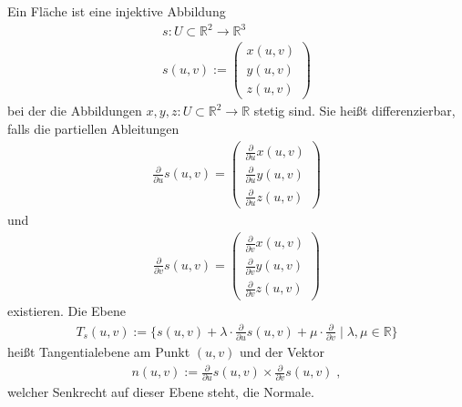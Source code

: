 \begin{Definition}
Ein Fläche ist   eine injektive Abbildung
\begin{align*}
s: U \subset \mathbb{R}^2 \to \mathbb{R}^3 \\
s(u,v) := \begin{pmatrix} x(u,v) \\ y(u,v) \\ z(u,v) \end{pmatrix} 
\end{align*} 
bei der die Abbildungen $x, y, z : U \subset \mathbb{R}^2 \to \mathbb{R}$ stetig sind. Sie heißt differenzierbar, falls die partiellen Ableitungen
\begin{align*}
\frac{\partial}{\partial u} s(u,v) = \begin{pmatrix}  \frac{\partial}{\partial u} x(u,v) \\  \frac{\partial}{\partial u} y(u,v) \\  \frac{\partial}{\partial u} z(u,v) \end{pmatrix}
\end{align*}
und 
\begin{align*}
\frac{\partial}{\partial v} s(u,v) =  \begin{pmatrix} \frac{\partial}{\partial v} x(u,v) \\ \frac{\partial}{\partial v} y(u,v) \\ \frac{\partial}{\partial v} z(u,v) \end{pmatrix}
\end{align*}
existieren. Die Ebene 
\begin{align*}
T_s(u,v) :=  \{ s(u,v) + \lambda \cdot \frac{\partial}{\partial u} s(u,v) + \mu \cdot \frac{\partial}{\partial v} \; | \; \lambda, \mu \in \mathbb{R} \}
\end{align*}
heißt Tangentialebene am Punkt $(u,v)$ und  der Vektor 
\begin{align*}
n (u,v):= \frac{\partial}{\partial u} s(u,v) \times \frac{\partial}{\partial v} s(u,v) \; ,
\end{align*}
welcher Senkrecht auf dieser Ebene steht,  die Normale.
\end{Definition}

